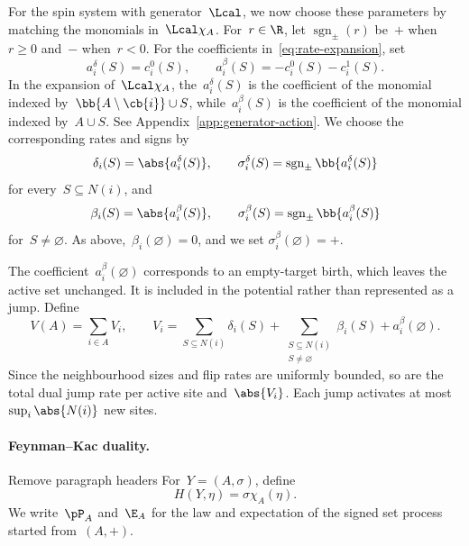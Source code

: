 \label{subsec:rates-to-dual}
For the spin system with generator~$\Lcal$, we now choose these parameters by
matching the monomials in~$\Lcal\chi_A$. For~$r\in\R$, let
$\operatorname{sgn}_{\pm}(r)$ be~$+$ when~$r\geq0$ and~$-$ when~$r<0$. For the
coefficients in~\eqref{eq:rate-expansion}, set
\begin{equation}
\label{eq:signed-dual-coefficients}
a_i^\delta(S)=c_i^0(S),
\qquad
a_i^\beta(S)=-c_i^0(S)-c_i^1(S).
\end{equation}
In the expansion of~$\Lcal\chi_A$, the~$a_i^\delta(S)$ is the coefficient of
the monomial indexed by~$\bb{A\setminus\cb{i}}\cup S$, while~$a_i^\beta(S)$
is the coefficient of the monomial indexed by~$A\cup S$. See
Appendix~\ref{app:generator-action}. We choose the corresponding rates and
signs by
\begin{equation}
\label{eq:death-split-data}
\delta_i(S)=\abs{a_i^\delta(S)},
\qquad
\sigma_i^\delta(S)=\operatorname{sgn}_{\pm}\bb{a_i^\delta(S)}
\end{equation}
for every~$S\subseteq N(i)$, and
\begin{equation}
\label{eq:birth-data}
\beta_i(S)=\abs{a_i^\beta(S)},
\qquad
\sigma_i^\beta(S)=\operatorname{sgn}_{\pm}\bb{a_i^\beta(S)}
\end{equation}
for~$S\neq\varnothing$. As above,~$\beta_i(\varnothing)=0$, and we set
$\sigma_i^\beta(\varnothing)=+$.

The coefficient~$a_i^\beta(\varnothing)$ corresponds to an empty-target birth,
which leaves the active set unchanged. It is included in the potential rather
than represented as a jump. Define
\begin{equation}
\label{eq:dual-potential}
V(A)=\sum_{i\in A}V_i,
\qquad
V_i=
\sum_{S\subseteq N(i)}\delta_i(S)
+
\sum_{\substack{S\subseteq N(i)\\S\neq\varnothing}}\beta_i(S)
+
a_i^\beta(\varnothing).
\end{equation}
Since the neighbourhood sizes and flip rates are uniformly bounded, so are the
total dual jump rate per active site and~$\abs{V_i}$. Each jump activates at
most~$\sup_i\abs{N(i)}$ new sites.

\paragraph{Feynman--Kac duality.}
\label{subsec:monomial-duality}
{\color{red} Remove paragraph headers}
For~$Y=(A,\sigma)$, define
\begin{equation}
\label{eq:monomial-duality-function}
H(Y,\eta)=\sigma\chi_A(\eta).
\end{equation}
We write~$\pP_A$ and~$\E_A$ for the law and expectation of the signed set
process started from~$(A,+)$.

